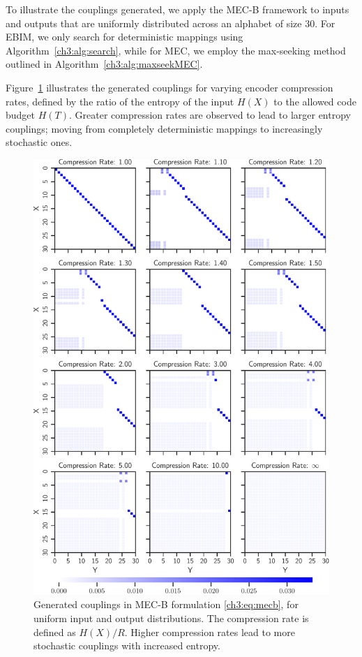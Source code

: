 To illustrate the couplings generated, we apply the MEC-B framework to inputs and outputs that are uniformly distributed across an alphabet of size 30. For EBIM, we only search for deterministic mappings using Algorithm~\ref{ch3:alg:search}, while for MEC, we employ the max-seeking method outlined in Algorithm~\ref{ch3:alg:maxseekMEC}.

Figure~\ref{ch3:fig:couplingvscomp} illustrates the generated couplings for varying encoder compression rates, defined by the ratio of the entropy of the input $H(X)$ to the allowed code budget $H(T)$. Greater compression rates are observed to lead to larger entropy couplings; moving from completely deterministic mappings to increasingly stochastic ones.

\begin{figure}[b!]
    \centering
    \includegraphics[width=.9\linewidth]{figs/ch3/couplingvscomp.pdf}
    \caption{
        Generated couplings in MEC-B formulation \eqref{ch3:eq:mecb}, for uniform input and output distributions. The compression rate is defined as $H(X)/R$. Higher compression rates lead to more stochastic couplings with increased entropy.
    }
    \label{ch3:fig:couplingvscomp}
\end{figure}
\FloatBarrier

